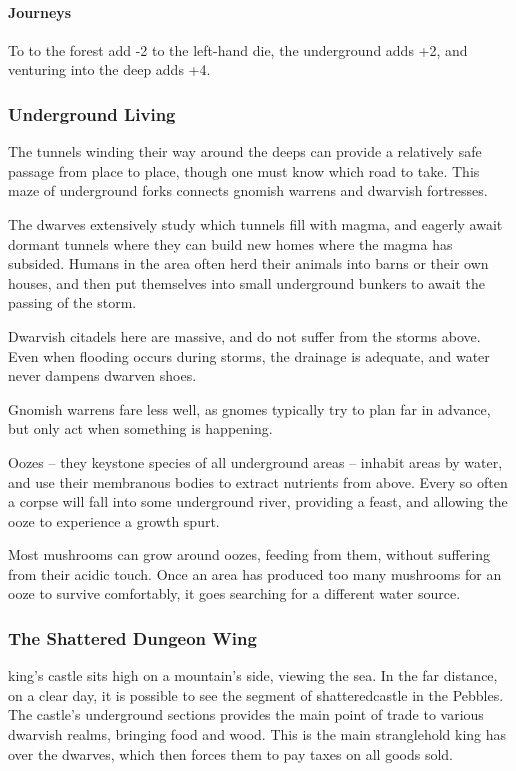 \begin{multicols}{2}
{  \paragraph{Journeys}
  To to the forest add -2 to the left-hand die, the underground adds +2, and venturing into the \gls{deep} adds +4.

  \subsubsection{Underground Living}
}
The tunnels winding their way around the deeps can provide a relatively safe passage from place to place, though one must know which road to take.
This maze of underground forks connects gnomish warrens and dwarvish fortresses.

The dwarves extensively study which tunnels fill with magma, and eagerly await dormant tunnels where they can build new homes where the magma has subsided.
Humans in the area often herd their animals into barns or their own houses, and then put themselves into small underground bunkers to await the passing of the storm.

Dwarvish citadels here are massive, and do not suffer from the storms above.
Even when flooding occurs during storms, the drainage is adequate, and water never dampens dwarven shoes.

Gnomish warrens fare less well, as gnomes typically try to plan far in advance, but only act when something is happening.

Oozes -- they keystone species of all underground areas -- inhabit areas by water, and use their membranous bodies to extract nutrients from above.
Every so often a corpse will fall into some underground river, providing a feast, and allowing the ooze to experience a growth spurt.

Most mushrooms can grow around oozes, feeding from them, without suffering from their acidic touch.
Once an area has produced too many mushrooms for an ooze to survive comfortably, it goes searching for a different water source.

\subsubsection{The Shattered Dungeon Wing}

\Gls{king}'s castle sits high on a mountain's side, viewing the sea.
In the far distance, on a clear day, it is possible to see the segment of \gls{shatteredcastle} in the Pebbles.
The castle's underground sections provides the main point of trade to various dwarvish realms, bringing food and wood.
This is the main stranglehold \gls{king} has over the dwarves, which then forces them to pay taxes on all goods sold.


\end{multicols}
